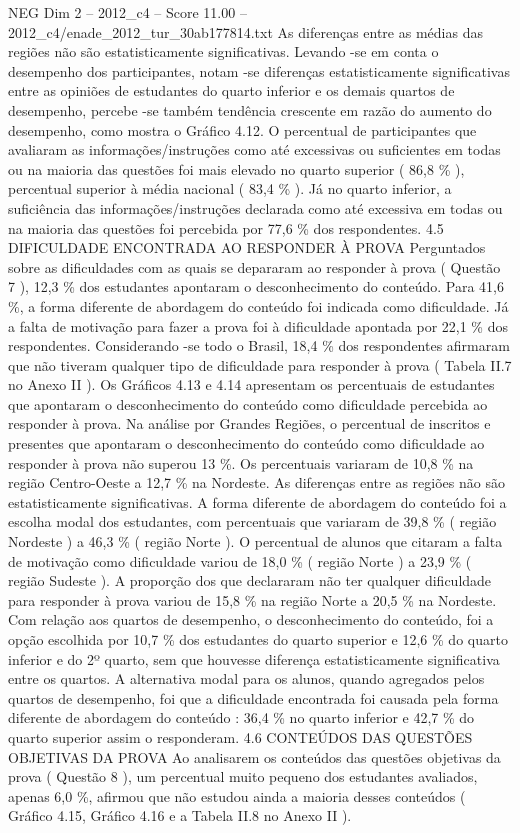 \begin{textsample}{NEG Dim 2 – 2012\_c4 – Score 11.00 – 2012\_c4/enade\_2012\_tur\_30ab177814.txt}
As diferenças entre as médias das regiões não são estatisticamente significativas.
Levando -se em conta o desempenho dos participantes, notam -se diferenças estatisticamente significativas entre as opiniões de estudantes do quarto inferior e os demais quartos de desempenho, percebe -se também tendência crescente em razão do aumento do desempenho, como mostra o Gráfico 4.12.
O percentual de participantes que avaliaram as informações/instruções como até excessivas ou suficientes em todas ou na maioria das questões foi mais elevado no quarto superior ( 86,8 \% ), percentual superior à média nacional ( 83,4 \% ).
Já no quarto inferior, a suficiência das informações/instruções declarada como até excessiva em todas ou na maioria das questões foi percebida por 77,6 \% dos respondentes. 4.5 DIFICULDADE ENCONTRADA AO RESPONDER À PROVA Perguntados sobre as dificuldades com as quais se depararam ao responder à prova ( Questão 7 ), 12,3 \% dos estudantes apontaram o desconhecimento do conteúdo.
Para 41,6 \%, a forma diferente de abordagem do conteúdo foi indicada como dificuldade.
Já a falta de motivação para fazer a prova foi à dificuldade apontada por 22,1 \% dos respondentes.
Considerando -se todo o Brasil, 18,4 \% dos respondentes afirmaram que não tiveram qualquer tipo de dificuldade para responder à prova ( Tabela II.7 no Anexo II ).
Os Gráficos 4.13 e 4.14 apresentam os percentuais de estudantes que apontaram o desconhecimento do conteúdo como dificuldade percebida ao responder à prova.
Na análise por Grandes Regiões, o percentual de inscritos e presentes que apontaram o desconhecimento do conteúdo como dificuldade ao responder à prova não superou 13 \%.
Os percentuais variaram de 10,8 \% na região Centro-Oeste a 12,7 \% na Nordeste.
As diferenças entre as regiões não são estatisticamente significativas.
A forma diferente de abordagem do conteúdo foi a escolha modal dos estudantes, com percentuais que variaram de 39,8 \% ( região Nordeste ) a 46,3 \% ( região Norte ).
O percentual de alunos que citaram a falta de motivação como dificuldade variou de 18,0 \% ( região Norte ) a 23,9 \% ( região Sudeste ).
A proporção dos que declararam não ter qualquer dificuldade para responder à prova variou de 15,8 \% na região Norte a 20,5 \% na Nordeste.
Com relação aos quartos de desempenho, o desconhecimento do conteúdo, foi a opção escolhida por 10,7 \% dos estudantes do quarto superior e 12,6 \% do quarto inferior e do 2º quarto, sem que houvesse diferença estatisticamente significativa entre os quartos.
A alternativa modal para os alunos, quando agregados pelos quartos de desempenho, foi que a dificuldade encontrada foi causada pela forma diferente de abordagem do conteúdo : 36,4 \% no quarto inferior e 42,7 \% do quarto superior assim o responderam. 4.6 CONTEÚDOS DAS QUESTÕES OBJETIVAS DA PROVA Ao analisarem os conteúdos das questões objetivas da prova ( Questão 8 ), um percentual muito pequeno dos estudantes avaliados, apenas 6,0 \%, afirmou que não estudou ainda a maioria desses conteúdos ( Gráfico 4.15, Gráfico 4.16 e a Tabela II.8 no Anexo II ).

\end{textsample}
